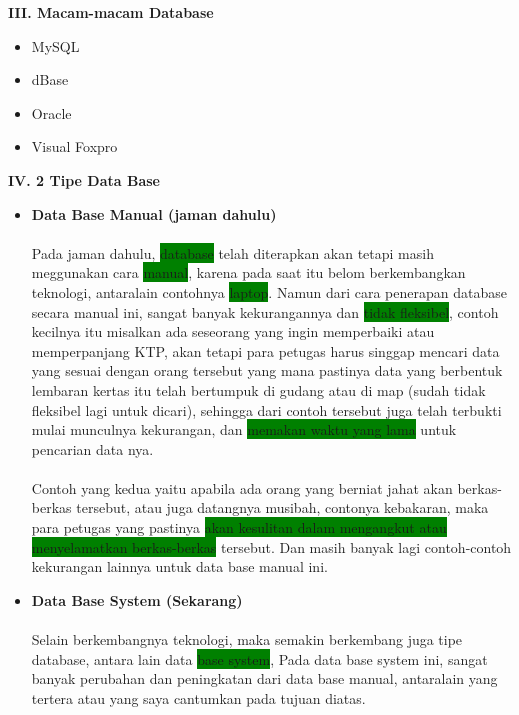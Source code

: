 \documentclass[a4paper,12pt]{article}
\newcommand{\hilight}[1]{\colorbox{green} {#1}}
\begin{document}
	\textbf{III. Macam-macam Database}
	\begin{itemize}
		\item MySQL 
		\item dBase
		\item Oracle
		\item Visual Foxpro
	\end{itemize}

	\vspace{0.8cm}
	
	\textbf{IV. 2 Tipe Data Base }\\
	\vspace{-0.3cm}
	\begin{itemize}
	\item \textbf{Data Base Manual (jaman dahulu) }
	\paragraph{}
		Pada jaman dahulu, \hilight{database} telah diterapkan akan tetapi masih meggunakan cara \hilight{manual}, karena pada saat itu belom berkembangkan teknologi, antaralain contohnya \hilight{laptop}. Namun dari cara penerapan database secara manual ini, sangat banyak kekurangannya dan \hilight{tidak fleksibel}, contoh kecilnya itu misalkan ada seseorang yang ingin memperbaiki atau memperpanjang KTP, akan tetapi para petugas harus singgap mencari data yang sesuai dengan orang tersebut yang mana pastinya data yang berbentuk lembaran kertas itu telah bertumpuk di gudang atau di map (sudah tidak fleksibel lagi untuk dicari), sehingga dari contoh tersebut juga telah terbukti mulai munculnya kekurangan, dan \hilight{memakan waktu yang lama} untuk pencarian data nya.
	  
	\paragraph{}
		Contoh yang kedua yaitu apabila ada orang yang berniat jahat akan berkas-berkas tersebut, atau juga datangnya musibah, contonya kebakaran, maka para petugas yang pastinya \hilight{akan kesulitan dalam mengangkut atau
		menyelamatkan berkas-berkas} tersebut. Dan masih banyak lagi contoh-contoh kekurangan lainnya untuk data base manual ini.
	
	\item\textbf{ Data Base System (Sekarang) }
	
	\paragraph{}
		Selain berkembangnya teknologi, maka semakin berkembang juga tipe database, antara lain data \hilight{base system}, Pada data base system ini, sangat banyak perubahan dan peningkatan dari data base manual, 
		antaralain yang tertera atau yang saya cantumkan pada tujuan diatas.
	\end{itemize}
\end{document}
